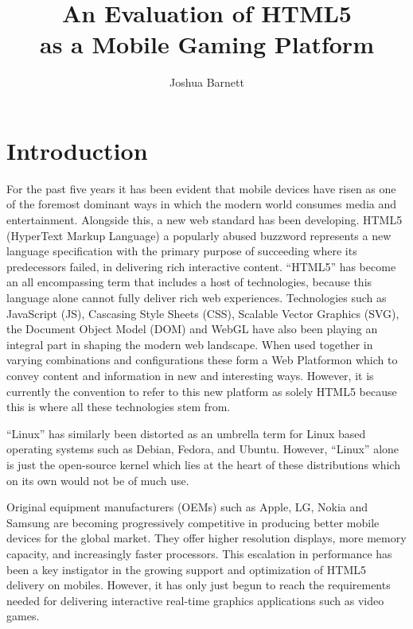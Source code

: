 \documentclass[final]{cmpreport}
\title{An Evaluation of HTML5\\as a Mobile Gaming Platform}
\author{Joshua Barnett}
\begin{document}
\section{Introduction}
For the past five years it has been evident that mobile devices have risen as one of the foremost dominant ways in which the modern world consumes media and entertainment. Alongside this, a new web standard has been developing. HTML5 (HyperText Markup Language) a popularly abused buzzword represents a new language specification with the primary purpose of succeeding where its predecessors failed, in delivering rich interactive content. ``HTML5'' has become an all encompassing term that includes a host of technologies, because this language alone cannot fully deliver rich web experiences. Technologies such as JavaScript (JS), Cascasing Style Sheets (CSS), Scalable Vector Graphics (SVG), the Document Object Model (DOM) and WebGL have also been playing an integral part in shaping the modern web landscape. When used together in varying combinations and configurations these form a Web Platform\footnotemark on which to convey content and information in new and interesting ways. However, it is currently the convention to refer to this new platform as solely HTML5 because this is where all these technologies stem from.


``Linux'' has similarly been distorted as an umbrella term for Linux based operating systems such as Debian, Fedora, and Ubuntu. However, ``Linux'' alone is just the open-source kernel which lies at the heart of these distributions which on its own would not be of much use.

Original equipment manufacturers (OEMs) such as Apple, LG, Nokia and Samsung are becoming progressively competitive in producing better mobile devices for the global market. They offer higher resolution displays, more memory capacity, and increasingly faster processors. This escalation in performance has been a key instigator in the growing support and optimization of HTML5 delivery on mobiles. However, it has only just begun to reach the requirements needed for delivering interactive real-time graphics applications such as video games.
\end{document}
